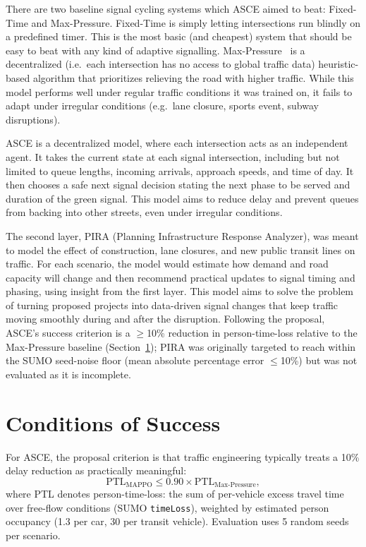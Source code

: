 \documentclass{article}
\begin{document}
There are two baseline signal cycling systems which ASCE aimed to beat: Fixed-Time and Max-Pressure. Fixed-Time is simply letting intersections run blindly on a predefined timer. This is the most basic (and cheapest) system that should be easy to beat with any kind of adaptive signalling. Max-Pressure~\cite{max_pressure_optimal} is a decentralized (i.e.\ each intersection has no access to global traffic data) heuristic-based algorithm that prioritizes relieving the road with higher traffic. While this model performs well under regular traffic conditions it was trained on, it fails to adapt under irregular conditions (e.g.\ lane closure, sports event, subway disruptions).

ASCE is a decentralized model, where each intersection acts as an independent agent. It takes the current state at each signal intersection, including but not limited to queue lengths, incoming arrivals, approach speeds, and time of day. It then chooses a safe next signal decision stating the next phase to be served and duration of the green signal. This model aims to reduce delay and prevent queues from backing into other streets, even under irregular conditions.

The second layer, PIRA (Planning Infrastructure Response Analyzer), was meant to model the effect of construction, lane closures, and new public transit lines on traffic. For each scenario, the model would estimate how demand and road capacity will change and then recommend practical updates to signal timing and phasing, using insight from the first layer. This model aims to solve the problem of turning proposed projects into data-driven signal changes that keep traffic moving smoothly during and after the disruption. Following the proposal, ASCE's success criterion is a $\geq$10\% reduction in person-time-loss relative to the Max-Pressure baseline (Section~\ref{sec:success}); PIRA was originally targeted to reach within the SUMO seed-noise floor (mean absolute percentage error $\leq$10\%) but was not evaluated as it is incomplete.

\section{Conditions of Success}
\label{sec:success}

For ASCE, the proposal criterion is that traffic engineering typically treats a 10\% delay reduction as practically meaningful:
\begin{equation}
  \mathrm{PTL}_{\mathrm{MAPPO}} \leq 0.90 \times \mathrm{PTL}_{\mathrm{Max\text{-}Pressure}},
  \label{eq:success}
\end{equation}
where PTL denotes person-time-loss: the sum of per-vehicle excess travel time over free-flow conditions (SUMO \texttt{timeLoss}), weighted by estimated person occupancy (1.3 per car, 30 per transit vehicle). Evaluation uses 5 random seeds per scenario.
\end{document}
